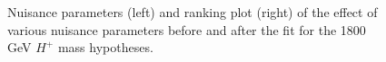 \begin{figure}[H]
  \centering
  \caption{Nuisance parameters (left) and ranking plot (right) of the effect of various nuisance parameters before and after the fit for the 1800 GeV $H^{+}$ mass hypotheses.}
\end{figure}
